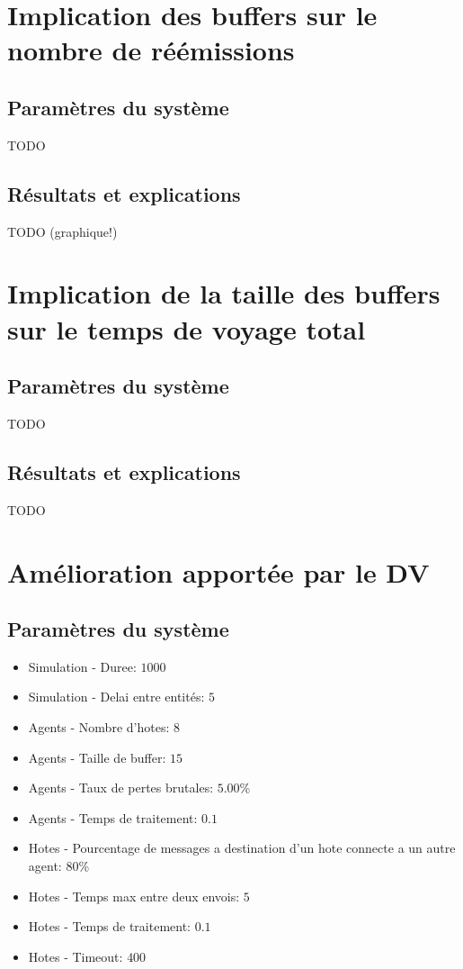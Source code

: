 \documentclass[a4paper,11pt]{article}
\begin{document}
\section{Implication des buffers sur le nombre de réémissions}
\subsection{Paramètres du système}
TODO

\subsection{Résultats et explications}
TODO (graphique!)






\section{Implication de la taille des buffers sur le temps de voyage total}
\subsection{Paramètres du système}
TODO

\subsection{Résultats et explications}
TODO









\section{Amélioration apportée par le DV}
\subsection{Paramètres du système}
\begin{itemize}
 \item Simulation - Duree: $1000$
 \item Simulation - Delai entre entités: $5$
 \item Agents - Nombre d'hotes: $8$
 \item Agents - Taille de buffer: $15$
 \item Agents - Taux de pertes brutales: $5.00$\%
 \item Agents - Temps de traitement: $0.1$
 \item Hotes - Pourcentage de messages a destination d'un hote connecte a un autre agent: $80$\%
 \item Hotes - Temps max entre deux envois: $5$
 \item Hotes - Temps de traitement: $0.1$
 \item Hotes - Timeout: $400$
\end{itemize}
\end{document}
